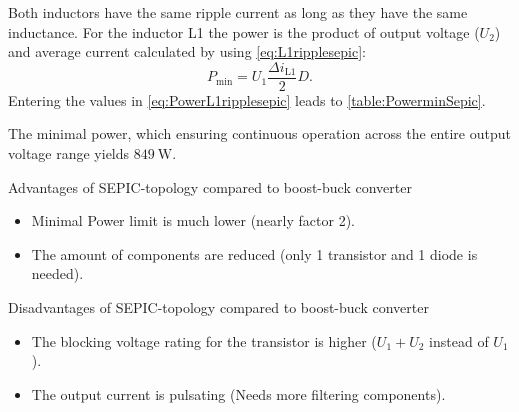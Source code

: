 
\begin{solutionblock}
    Both inductors have the same ripple current as long as they have the same inductance.
    For the inductor L1 the power is the product of output voltage
     ($U_\mathrm{2}$) and average current calculated by using \eqref{eq:L1ripplesepic}:
    \begin{equation}
        P_\mathrm{min}=U_\mathrm{1}\frac{\Delta i_\mathrm{L1}}{2}D.
        \label{eq:PowerL1ripplesepic}
    \end{equation}
    Entering the values in \eqref{eq:PowerL1ripplesepic} leads to \autoref{table:PowerminSepic}.
    
    The minimal power, which ensuring continuous operation across the entire output voltage range
    yields  $\SI{849}{\watt}$.

\end{solutionblock}



\begin{solutionblock}
    Advantages of SEPIC-topology compared to boost-buck converter
    \begin{itemize}
        \item Minimal Power limit is much lower (nearly factor 2).
        \item The amount of components are reduced (only 1 transistor and 1 diode is needed).
    \end{itemize}  
    Disadvantages of SEPIC-topology compared to boost-buck converter
    \begin{itemize}
        \item The blocking voltage rating for the transistor is higher ($U_\mathrm{1}+U_\mathrm{2}$ instead of $U_\mathrm{1}$).
        \item The output current is pulsating (Needs more filtering components).
    \end{itemize}  
\end{solutionblock}
